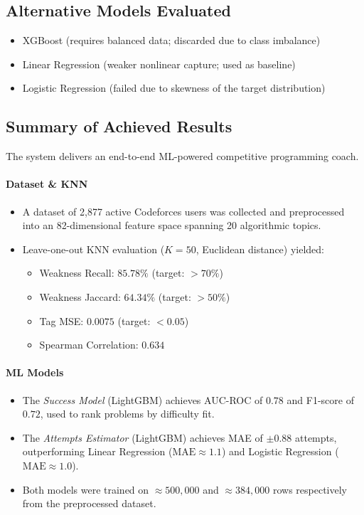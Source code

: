 \documentclass[12pt,a4paper]{article}
\begin{document}
\subsection*{Alternative Models Evaluated}
    \begin{itemize}
        \item XGBoost (requires balanced data; discarded due to class imbalance)
        \item Linear Regression (weaker nonlinear capture; used as baseline)
        \item Logistic Regression (failed due to skewness of the target distribution)
    \end{itemize}

\subsection*{Summary of Achieved Results}

The system delivers an end-to-end ML-powered competitive programming coach.

\paragraph{Dataset \& KNN}
\begin{itemize}
    \item A dataset of 2{,}877 active Codeforces users was collected and preprocessed
          into an 82-dimensional feature space spanning 20 algorithmic topics.
    \item Leave-one-out KNN evaluation ($K{=}50$, Euclidean distance) yielded:
    \begin{itemize}
        \item Weakness Recall: $85.78\%$ (target: ${>}70\%$)
        \item Weakness Jaccard: $64.34\%$ (target: ${>}50\%$)
        \item Tag MSE: $0.0075$ (target: ${<}0.05$)
        \item Spearman Correlation: $0.634$
    \end{itemize}
\end{itemize}

\paragraph{ML Models}
\begin{itemize}
    \item The \textit{Success Model} (LightGBM) achieves AUC-ROC of $0.78$ and
          F1-score of $0.72$, used to rank problems by difficulty fit.
    \item The \textit{Attempts Estimator} (LightGBM) achieves MAE of ${\pm}0.88$
          attempts, outperforming Linear Regression ($\text{MAE} \approx 1.1$)
          and Logistic Regression ($\text{MAE} \approx 1.0$).
    \item Both models were trained on ${\approx}500{,}000$ and ${\approx}384{,}000$
          rows respectively from the preprocessed dataset.
\end{itemize}
\end{document}
